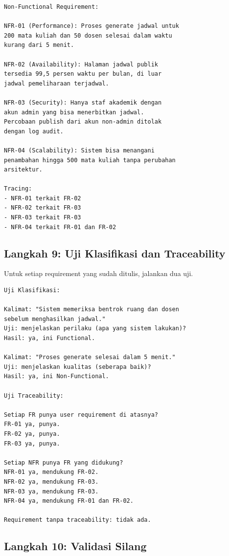 \documentclass[11pt,a4paper]{article}
\begin{document}
\begin{lstlisting}[style=out]
Non-Functional Requirement:

NFR-01 (Performance): Proses generate jadwal untuk
200 mata kuliah dan 50 dosen selesai dalam waktu
kurang dari 5 menit.

NFR-02 (Availability): Halaman jadwal publik
tersedia 99,5 persen waktu per bulan, di luar
jadwal pemeliharaan terjadwal.

NFR-03 (Security): Hanya staf akademik dengan
akun admin yang bisa menerbitkan jadwal.
Percobaan publish dari akun non-admin ditolak
dengan log audit.

NFR-04 (Scalability): Sistem bisa menangani
penambahan hingga 500 mata kuliah tanpa perubahan
arsitektur.

Tracing:
- NFR-01 terkait FR-02
- NFR-02 terkait FR-03
- NFR-03 terkait FR-03
- NFR-04 terkait FR-01 dan FR-02
\end{lstlisting}

\subsection{Langkah 9: Uji Klasifikasi dan Traceability}

Untuk setiap requirement yang sudah ditulis, jalankan dua uji.

\begin{lstlisting}[style=out]
Uji Klasifikasi:

Kalimat: "Sistem memeriksa bentrok ruang dan dosen
sebelum menghasilkan jadwal."
Uji: menjelaskan perilaku (apa yang sistem lakukan)?
Hasil: ya, ini Functional.

Kalimat: "Proses generate selesai dalam 5 menit."
Uji: menjelaskan kualitas (seberapa baik)?
Hasil: ya, ini Non-Functional.

Uji Traceability:

Setiap FR punya user requirement di atasnya?
FR-01 ya, punya.
FR-02 ya, punya.
FR-03 ya, punya.

Setiap NFR punya FR yang didukung?
NFR-01 ya, mendukung FR-02.
NFR-02 ya, mendukung FR-03.
NFR-03 ya, mendukung FR-03.
NFR-04 ya, mendukung FR-01 dan FR-02.

Requirement tanpa traceability: tidak ada.
\end{lstlisting}

\subsection{Langkah 10: Validasi Silang}
\end{document}
